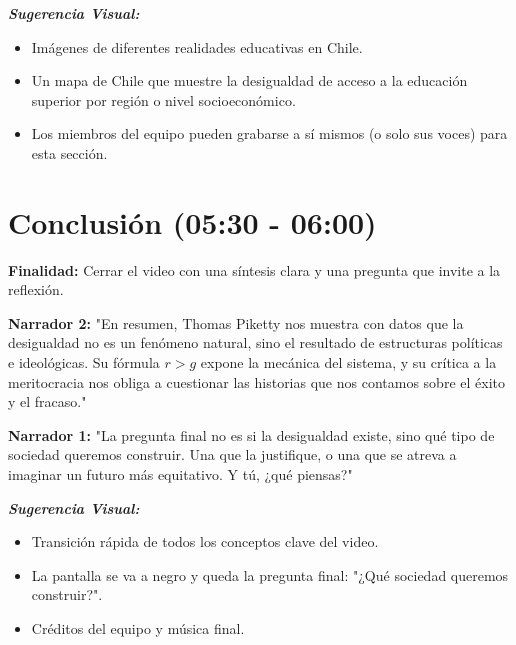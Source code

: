 \documentclass[12pt, a4paper]{article}
\begin{document}
\vspace{0.5cm}

\textit{\textbf{Sugerencia Visual:}} 
\begin{itemize}
    \item Imágenes de diferentes realidades educativas en Chile.
    \item Un mapa de Chile que muestre la desigualdad de acceso a la educación superior por región o nivel socioeconómico.
    \item Los miembros del equipo pueden grabarse a sí mismos (o solo sus voces) para esta sección.
\end{itemize}

\section{Conclusión (05:30 - 06:00)}

\textbf{Finalidad:} Cerrar el video con una síntesis clara y una pregunta que invite a la reflexión.

\vspace{0.5cm}

\textbf{Narrador 2:}
"En resumen, Thomas Piketty nos muestra con datos que la desigualdad no es un fenómeno natural, sino el resultado de estructuras políticas e ideológicas. Su fórmula \( r > g \) expone la mecánica del sistema, y su crítica a la meritocracia nos obliga a cuestionar las historias que nos contamos sobre el éxito y el fracaso."

\vspace{0.5cm}

\textbf{Narrador 1:}
"La pregunta final no es si la desigualdad existe, sino qué tipo de sociedad queremos construir. Una que la justifique, o una que se atreva a imaginar un futuro más equitativo. Y tú, ¿qué piensas?"

\vspace{0.5cm}

\textit{\textbf{Sugerencia Visual:}} 
\begin{itemize}
    \item Transición rápida de todos los conceptos clave del video.
    \item La pantalla se va a negro y queda la pregunta final: "¿Qué sociedad queremos construir?".
    \item Créditos del equipo y música final.
\end{itemize}
\end{document}
